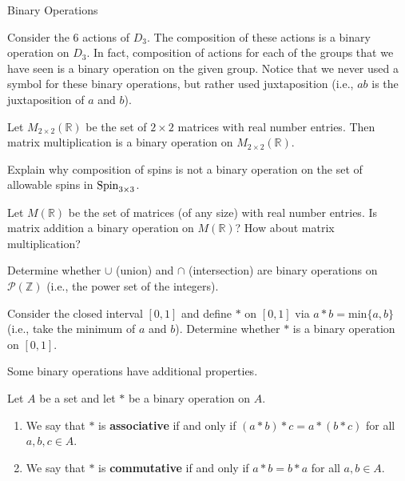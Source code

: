 \begin{section}{Binary Operations}
\begin{example}
Consider the 6 actions of $D_3$.  The composition of these actions is a binary operation on $D_3$.  In fact, composition of actions for each of the groups that we have seen is a binary operation on the given group.  Notice that we never used a symbol for these binary operations, but rather used juxtaposition (i.e., $ab$ is the juxtaposition of $a$ and $b$).
\end{example}

\begin{example}
Let $M_{2\times 2}(\mathbb{R})$ be the set of $2\times 2$ matrices with real number entries.  Then matrix multiplication is a binary operation on $M_{2\times 2}(\mathbb{R})$.
\end{example}

\begin{exercise}
Explain why composition of spins is not a binary operation on the set of allowable spins in $\operatorname{Spin}_{3\times 3}$.
\end{exercise}

\begin{exercise}
Let $M(\mathbb{R})$ be the set of matrices (of any size) with real number entries.  Is matrix addition a binary operation on $M(\mathbb{R})$?  How about matrix multiplication?
\end{exercise}

\begin{exercise}
Determine whether $\cup$ (union) and $\cap$ (intersection) are binary operations on $\mathcal{P}(\mathbb{Z})$ (i.e., the power set of the integers).
\end{exercise}

\begin{exercise}
Consider the closed interval $[0,1]$ and define $*$ on $[0,1]$ via $a*b=\mathrm{min}\{a,b\}$ (i.e., take the minimum of $a$ and $b$).  Determine whether $*$ is a binary operation on $[0,1]$.
\end{exercise}

Some binary operations have additional properties.

\begin{definition}
Let $A$ be a set and let $*$ be a binary operation on $A$.
\begin{enumerate}
\item We say that $*$ is \textbf{associative} if and only if $(a*b)*c=a*(b*c)$ for all $a,b,c\in A$.
\item We say that $*$ is \textbf{commutative} if and only if $a*b=b*a$ for all $a,b\in A$.
\end{enumerate}
\end{definition}


\end{section}
